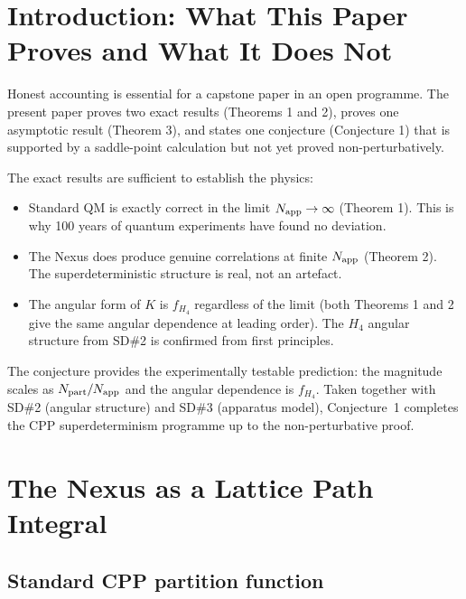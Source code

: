 \documentclass[11pt,a4paper]{article}
\newcommand{\Napp}{N_{\rm app}}
\newcommand{\Npart}{N_{\rm part}}
\begin{document}
\section{Introduction: What This Paper Proves and What It Does Not}

Honest accounting is essential for a capstone paper in an open
programme.  The present paper proves two exact results (Theorems 1
and 2), proves one asymptotic result (Theorem 3), and states one
conjecture (Conjecture 1) that is supported by a saddle-point
calculation but not yet proved non-perturbatively.

The exact results are sufficient to establish the physics:
\begin{itemize}
\item Standard QM is exactly correct in the limit $\Napp \to \infty$
  (Theorem 1).  This is why 100 years of quantum experiments have
  found no deviation.
\item The Nexus does produce genuine correlations at finite $\Napp$
  (Theorem 2).  The superdeterministic structure is real, not an
  artefact.
\item The angular form of $K$ is $f_{H_4}$ regardless of the limit
  (both Theorems 1 and 2 give the same angular dependence at leading
  order).  The $H_4$ angular structure from SD\#2 is confirmed from
  first principles.
\end{itemize}

The conjecture provides the experimentally testable prediction: the
magnitude scales as $\Npart/\Napp$ and the angular dependence is
$f_{H_4}$.  Taken together with SD\#2 (angular structure) and
SD\#3 (apparatus model), Conjecture~1 completes the CPP
superdeterminism programme up to the non-perturbative proof.

\section{The Nexus as a Lattice Path Integral}
\label{sec:path_integral}

\subsection{Standard CPP partition function}
\end{document}
